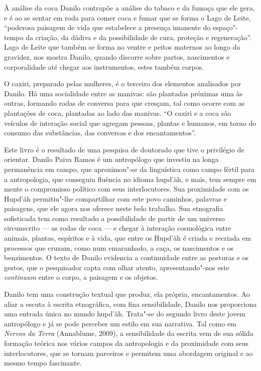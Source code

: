 À análise da coca Danilo contrapõe a análise do tabaco e da fumaça que
ele gera, e é ao se sentar em roda para comer coca e fumar que se forma
o Lago de Leite, ``poderosa paisagem de vida que estabelece a presença
imanente do espaço"-tempo da criação, da dádiva e da possibilidade de
cura, proteção e regeneração''. Lago de Leite que também se forma no
ventre e peitos maternos ao longo da gravidez, nos mostra Danilo, quando
discorre sobre partos, nascimentos e corporalidade até chegar aos
instrumentos, estes também corpos.

O caxiri, preparado pelas mulheres, é o terceiro dos elementos
analisados por Danilo. Há uma socialidade entre as manivas: são
plantadas próximas uma às outras, formando rodas de conversa para que
cresçam, tal como ocorre com as plantações de coca, plantadas ao lado
das manivas. ``O caxiri e a coca são veículos de interação social que
agregam pessoas, plantas e humanos, em torno do consumo das substâncias,
das conversas e dos encantamentos''.

Este livro é o resultado de uma pesquisa de doutorado que tive o
privilégio de orientar. Danilo Paiva Ramos é um antropólogo que investiu
na longa permanência em campo, que aproximou"-se da linguística como
campo fértil para a antropologia, que conseguiu fluência no idioma
hupd'äh, e mais, tem sempre em mente o compromisso político com seus
interlocutores. Sua proximidade com os Hupd'äh permitiu"-lhe compartilhar
com este povo caminhos, palavras e paisagens, que ele agora nos oferece
neste belo trabalho. Sua etnografia sofisticada tem como resultado a
possibilidade de partir de um universo circunscrito --- as rodas de coca
--- e chegar à interação cosmológica entre animais, plantas, espíritos e
à vida, que entre os Hupd'äh é criada e recriada em processos que
cruzam, como num emaranhado, a caça, os nascimentos e os benzimentos. O
texto de Danilo evidencia a continuidade entre as posturas e os gestos,
que o pesquisador capta com olhar atento, apresentando"-nos este
\emph{continuum} entre o corpo, a paisagem e os objetos.

Danilo tem uma construção textual que produz, ela própria,
encantamentos. Ao aliar a escuta à escrita etnográfica, com fina
sensibilidade, Danilo nos proporciona uma entrada única no mundo
hupd'äh. Trata"-se do segundo livro deste jovem antropólogo e já se pode
perceber um estilo em sua narrativa. Tal como em \emph{Nervos da Terra}
(Annablume, 2009), a sensibilidade da escrita vem de sua sólida formação
teórica nos vários campos da antropologia e da proximidade com seus
interlocutores, que se tornam parceiros e permitem uma abordagem
original e ao mesmo tempo fascinante.

